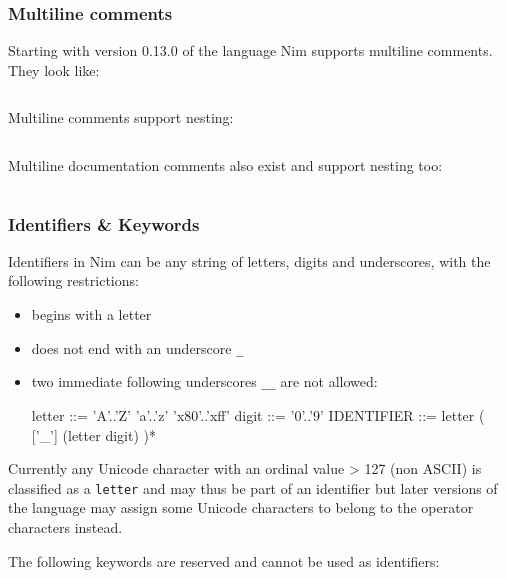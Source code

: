 \hypertarget{multiline-comments}{%
\subsubsection{Multiline comments}\label{multiline-comments}}

Starting with version 0.13.0 of the language Nim supports multiline
comments. They look like:

\begin{verbatim}
\end{verbatim}

Multiline comments support nesting:

\begin{verbatim}
\end{verbatim}

Multiline documentation comments also exist and support nesting too:

\begin{verbatim}
\end{verbatim}

\hypertarget{identifiers-keywords}{%
\subsubsection{Identifiers \& Keywords}\label{identifiers-keywords}}

Identifiers in Nim can be any string of letters, digits and underscores,
with the following restrictions:

\begin{itemize}
\item
  begins with a letter
\item
  does not end with an underscore \texttt{\_}
\item
  two immediate following underscores \texttt{\_\_} are not allowed:

  letter ::= 'A'..'Z' \textbar{} 'a'..'z' \textbar{} 'x80'..'xff' digit
  ::= '0'..'9' IDENTIFIER ::= letter ( {[}'\_'{]} (letter \textbar{}
  digit) )*
\end{itemize}

Currently any Unicode character with an ordinal value \textgreater{} 127
(non ASCII) is classified as a \texttt{letter} and may thus be part of
an identifier but later versions of the language may assign some Unicode
characters to belong to the operator characters instead.

The following keywords are reserved and cannot be used as identifiers:

\begin{verbatim}
\end{verbatim}

